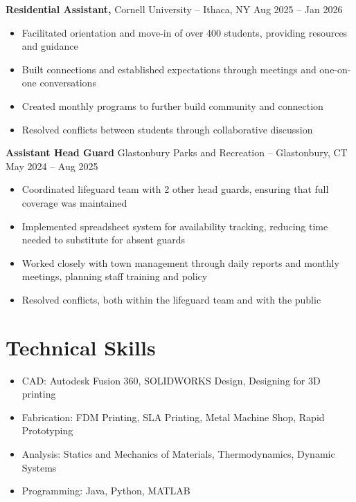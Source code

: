 \documentclass[12pt]{article}       %
\begin{document}
\textbf{Residential Assistant,} {Cornell University} -- Ithaca, NY \hfill Aug 2025 -- Jan 2026
\\
\vspace{-9pt}
\begin{itemize}
  \item Facilitated orientation and move-in of over 400 students, providing resources
        and guidance
  \item Built connections and established expectations through meetings and one-on-one
        conversations
  \item Created monthly programs to further build community and connection
  \item Resolved conflicts between students through collaborative discussion
\end{itemize}
\textbf{Assistant Head Guard} {Glastonbury Parks and Recreation} -- Glastonbury, CT \hfill May 2024 -- Aug 2025 \\
\vspace{-9pt}
\begin{itemize}
  \item Coordinated lifeguard team with 2 other head guards, ensuring that full
        coverage was maintained
  \item Implemented spreadsheet system for availability tracking, reducing time needed
        to substitute for absent guards
  \item Worked closely with town management through daily reports and monthly meetings,
        planning staff training and policy
  \item Resolved conflicts, both within the lifeguard team and with the public
\end{itemize}

\vspace{-18.5pt}

\section*{Technical Skills}
\begin{itemize}
  \item CAD: Autodesk Fusion 360, SOLIDWORKS Design, Designing for 3D printing
  \item Fabrication: FDM Printing, SLA Printing, Metal Machine Shop, Rapid Prototyping
  \item Analysis: Statics and Mechanics of Materials, Thermodynamics, Dynamic Systems
  \item Programming: Java, Python, MATLAB
\end{itemize}
\vspace{-18.5pt}
\end{document}
